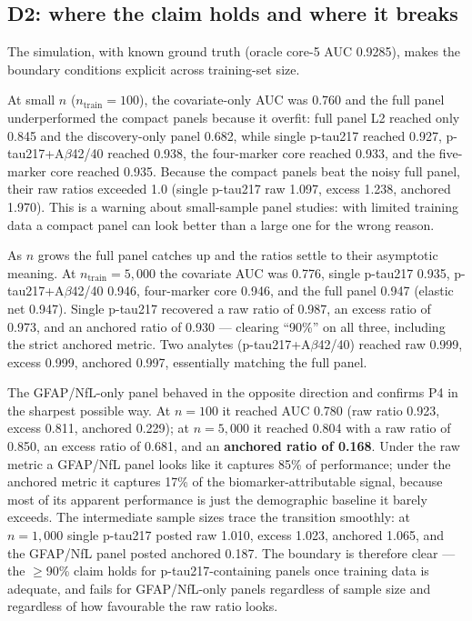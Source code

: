 \documentclass{article}
\begin{document}
\subsection{D2: where the claim holds and where it breaks}

The simulation, with known ground truth (oracle core-5 AUC 0.9285), makes the
boundary conditions explicit across training-set size.

At small $n$ ($n_{\mathrm{train}}=100$), the covariate-only AUC was 0.760 and
the full panel underperformed the compact panels because it overfit: full panel
L2 reached only 0.845 and the discovery-only panel 0.682, while single
p-tau217 reached 0.927, p-tau217+A$\beta$42/40 reached 0.938, the four-marker
core reached 0.933, and the five-marker core reached 0.935. Because the compact
panels beat the noisy full panel, their raw ratios exceeded 1.0 (single
p-tau217 raw 1.097, excess 1.238, anchored 1.970). This is a warning about
small-sample panel studies: with limited training data a compact panel can look
better than a large one for the wrong reason.

As $n$ grows the full panel catches up and the ratios settle to their
asymptotic meaning. At $n_{\mathrm{train}}=5{,}000$ the covariate AUC was
0.776, single p-tau217 0.935, p-tau217+A$\beta$42/40 0.946, four-marker core
0.946, and the full panel 0.947 (elastic net 0.947). Single p-tau217 recovered
a raw ratio of 0.987, an excess ratio of 0.973, and an anchored ratio of 0.930
--- clearing ``90\%'' on all three, including the strict anchored metric. Two
analytes (p-tau217+A$\beta$42/40) reached raw 0.999, excess 0.999, anchored
0.997, essentially matching the full panel.

The GFAP/NfL-only panel behaved in the opposite direction and confirms P4 in
the sharpest possible way. At $n=100$ it reached AUC 0.780 (raw ratio 0.923,
excess 0.811, anchored 0.229); at $n=5{,}000$ it reached 0.804 with a raw ratio
of 0.850, an excess ratio of 0.681, and an \textbf{anchored ratio of 0.168}.
Under the raw metric a GFAP/NfL panel looks like it captures 85\% of
performance; under the anchored metric it captures 17\% of the
biomarker-attributable signal, because most of its apparent performance is just
the demographic baseline it barely exceeds. The intermediate sample sizes trace
the transition smoothly: at $n=1{,}000$ single p-tau217 posted raw 1.010,
excess 1.023, anchored 1.065, and the GFAP/NfL panel posted anchored 0.187. The
boundary is therefore clear --- the $\geq$90\% claim holds for
p-tau217-containing panels once training data is adequate, and fails for
GFAP/NfL-only panels regardless of sample size and regardless of how favourable
the raw ratio looks.
\end{document}
